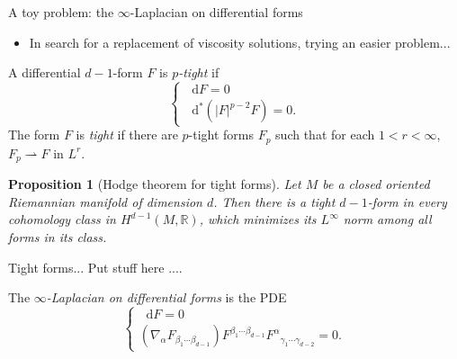 \documentclass[10pt]{beamer}
\newcommand{\RR}{\mathbb{R}}
\newcommand*\dif{\mathop{}\!\mathrm{d}}
\newtheorem{proposition}{Proposition}
\begin{document}
\begin{frame}{A toy problem: the $\infty$-Laplacian on differential forms}
\begin{itemize}
\item In search for a replacement of viscosity solutions, trying an easier problem...
\end{itemize}

\begin{definition}[B '24]
A differential $d - 1$-form $F$ is \emph{$p$-tight} if 
$$
\begin{cases}
    \dif F = 0 \\
    \dif^* (|F|^{p - 2} F) = 0.
\end{cases}$$
The form $F$ is \emph{tight} if there are $p$-tight forms $F_p$ such that for each $1 < r < \infty$, $F_p \rightharpoonup F$ in $L^r$.
\end{definition}

\begin{proposition}[Hodge theorem for tight forms]
Let $M$ be a closed oriented Riemannian manifold of dimension $d$.
Then there is a tight $d - 1$-form in every cohomology class in $H^{d - 1}(M, \RR)$, which minimizes its $L^\infty$ norm among all forms in its class.
\end{proposition}
\end{frame}

\begin{frame}{Tight forms...}
    Put stuff here .... 

\begin{definition}[B '24]
The \emph{$\infty$-Laplacian on differential forms} is the PDE 
$$\begin{cases}
    \dif F = 0 \\
    (\nabla_\alpha F_{\beta_1 \cdots \beta_{d - 1}}) F^{\beta_1 \cdots \beta_{d - 1}} {F^\alpha}_{\gamma_1 \cdots \gamma_{d - 2}} = 0.
\end{cases}$$
\end{definition}
\end{frame}
\end{document}
